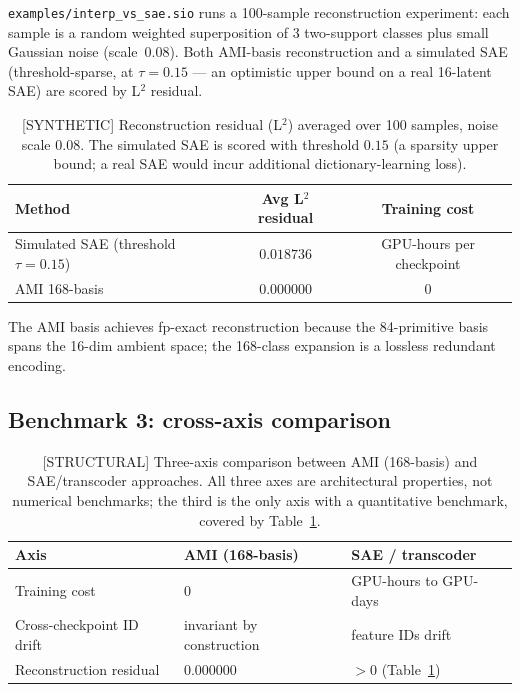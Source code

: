 \documentclass{article}
\begin{document}
\texttt{examples/interp\_vs\_sae.sio} runs a 100-sample reconstruction
experiment: each sample is a random weighted superposition of $3$
two-support classes plus small Gaussian noise (scale~$0.08$).  Both
AMI-basis reconstruction and a simulated SAE (threshold-sparse, at
$\tau = 0.15$ --- an optimistic upper bound on a real 16-latent SAE)
are scored by L${}^2$ residual.

\begin{table}[h]
\centering
\caption{[SYNTHETIC] Reconstruction residual (L${}^2$) averaged over 100 samples,
         noise scale $0.08$.  The simulated SAE is scored with
         threshold $0.15$ (a sparsity upper bound; a real SAE would
         incur additional dictionary-learning loss).}
\label{tab:recon}
\begin{tabular}{lcc}
\toprule
Method & Avg L${}^2$ residual & Training cost \\
\midrule
Simulated SAE (threshold $\tau = 0.15$) & $0.018736$  & GPU-hours per checkpoint \\
AMI 168-basis                            & $\mathbf{0.000000}$ & 0 \\
\bottomrule
\end{tabular}
\end{table}

The AMI basis achieves fp-exact reconstruction because the 84-primitive
basis spans the 16-dim ambient space; the 168-class expansion is a
lossless redundant encoding.

\subsection{Benchmark 3: cross-axis comparison}

\begin{table}[h]
\centering
\caption{[STRUCTURAL] Three-axis comparison between AMI (168-basis) and SAE/transcoder
         approaches.  All three axes are architectural properties, not
         numerical benchmarks; the third is the only axis with a
         quantitative benchmark, covered by Table~\ref{tab:recon}.}
\label{tab:axes}
\begin{tabular}{lll}
\toprule
Axis & AMI (168-basis) & SAE / transcoder \\
\midrule
Training cost            & $0$                        & GPU-hours to GPU-days \\
Cross-checkpoint ID drift & invariant by construction  & feature IDs drift \\
Reconstruction residual  & $0.000000$                 & $> 0$ (Table~\ref{tab:recon}) \\
\bottomrule
\end{tabular}
\end{table}
\end{document}
